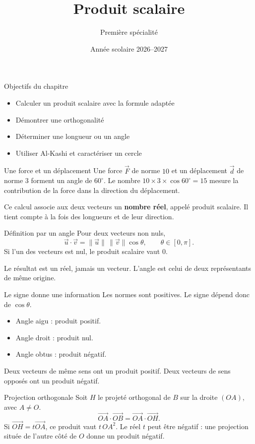 \documentclass[aspectratio=169,12pt]{beamer}
\title{Produit scalaire}
\subtitle{Première spécialité}
\date{Année scolaire 2026--2027}
\begin{document}
\begin{frame}\titlepage\end{frame}
\begin{frame}{Objectifs du chapitre}\begin{itemize}
\item Calculer un produit scalaire avec la formule adaptée
\item Démontrer une orthogonalité
\item Déterminer une longueur ou un angle
\item Utiliser Al-Kashi et caractériser un cercle
\end{itemize}\end{frame}
\renewcommand{\slidekind}{COMPRENDRE}
\begin{frame}[t,fragile]{Une force et un déplacement}
Une force $\vec F$ de norme $10$ et un déplacement $\vec d$ de norme $3$ forment un angle de $60^\circ$. Le nombre $10\times3\times\cos60^\circ=15$ mesure la contribution de la force dans la direction du déplacement.\medskip\par Ce calcul associe aux deux vecteurs un \textbf{nombre réel}, appelé produit scalaire. Il tient compte à la fois des longueurs et de leur direction.
\end{frame}
\renewcommand{\slidekind}{COMPRENDRE}
\begin{frame}[t,fragile]{Définition par un angle}
Pour deux vecteurs non nuls,\[\vec u\cdot\vec v=\|\vec u\|\,\|\vec v\|\cos\theta,\qquad\theta\in[0,\pi].\]Si l’un des vecteurs est nul, le produit scalaire vaut $0$.\medskip\par Le résultat est un réel, jamais un vecteur. L’angle est celui de deux représentants de même origine.
\end{frame}
\renewcommand{\slidekind}{COMPRENDRE}
\begin{frame}[t,fragile]{Le signe donne une information}
Les normes sont positives. Le signe dépend donc de $\cos\theta$.\begin{itemize}\item Angle aigu : produit positif.\item Angle droit : produit nul.\item Angle obtus : produit négatif.\end{itemize}Deux vecteurs de même sens ont un produit positif. Deux vecteurs de sens opposés ont un produit négatif.
\end{frame}
\renewcommand{\slidekind}{COMPRENDRE}
\begin{frame}[t,fragile]{Projection orthogonale}
Soit $H$ le projeté orthogonal de $B$ sur la droite $(OA)$, avec $A\ne O$.\[\overrightarrow{OA}\cdot\overrightarrow{OB}=\overrightarrow{OA}\cdot\overrightarrow{OH}.\]Si $\overrightarrow{OH}=t\overrightarrow{OA}$, ce produit vaut $t\,OA^2$. Le réel $t$ peut être négatif : une projection située de l’autre côté de $O$ donne un produit négatif.
\end{frame}
\end{document}

